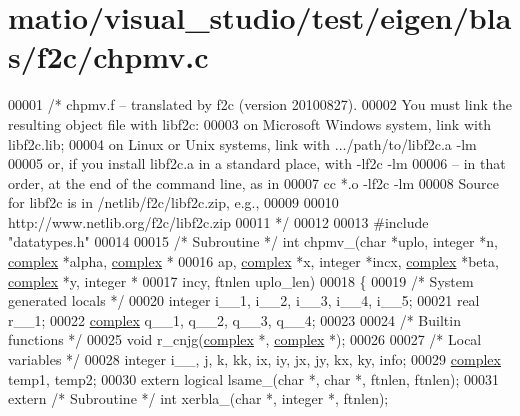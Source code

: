 \hypertarget{matio_2visual__studio_2test_2eigen_2blas_2f2c_2chpmv_8c_source}{}\section{matio/visual\+\_\+studio/test/eigen/blas/f2c/chpmv.c}
\label{matio_2visual__studio_2test_2eigen_2blas_2f2c_2chpmv_8c_source}

\begin{DoxyCode}
00001 \textcolor{comment}{/* chpmv.f -- translated by f2c (version 20100827).}
00002 \textcolor{comment}{   You must link the resulting object file with libf2c:}
00003 \textcolor{comment}{    on Microsoft Windows system, link with libf2c.lib;}
00004 \textcolor{comment}{    on Linux or Unix systems, link with .../path/to/libf2c.a -lm}
00005 \textcolor{comment}{    or, if you install libf2c.a in a standard place, with -lf2c -lm}
00006 \textcolor{comment}{    -- in that order, at the end of the command line, as in}
00007 \textcolor{comment}{        cc *.o -lf2c -lm}
00008 \textcolor{comment}{    Source for libf2c is in /netlib/f2c/libf2c.zip, e.g.,}
00009 \textcolor{comment}{}
00010 \textcolor{comment}{        http://www.netlib.org/f2c/libf2c.zip}
00011 \textcolor{comment}{*/}
00012 
00013 \textcolor{preprocessor}{#include "datatypes.h"}
00014 
00015 \textcolor{comment}{/* Subroutine */} \textcolor{keywordtype}{int} chpmv\_(\textcolor{keywordtype}{char} *uplo, integer *n, \hyperlink{structcomplex}{complex} *alpha, 
      \hyperlink{structcomplex}{complex} *
00016     ap, \hyperlink{structcomplex}{complex} *x, integer *incx, \hyperlink{structcomplex}{complex} *beta, \hyperlink{structcomplex}{complex} *y, integer *
00017     incy, ftnlen uplo\_len)
00018 \{
00019     \textcolor{comment}{/* System generated locals */}
00020     integer i\_\_1, i\_\_2, i\_\_3, i\_\_4, i\_\_5;
00021     real r\_\_1;
00022     \hyperlink{structcomplex}{complex} q\_\_1, q\_\_2, q\_\_3, q\_\_4;
00023 
00024     \textcolor{comment}{/* Builtin functions */}
00025     \textcolor{keywordtype}{void} r\_cnjg(\hyperlink{structcomplex}{complex} *, \hyperlink{structcomplex}{complex} *);
00026 
00027     \textcolor{comment}{/* Local variables */}
00028     integer i\_\_, j, k, kk, ix, iy, jx, jy, kx, ky, info;
00029     \hyperlink{structcomplex}{complex} temp1, temp2;
00030     \textcolor{keyword}{extern} logical lsame\_(\textcolor{keywordtype}{char} *, \textcolor{keywordtype}{char} *, ftnlen, ftnlen);
00031     \textcolor{keyword}{extern} \textcolor{comment}{/* Subroutine */} \textcolor{keywordtype}{int} xerbla\_(\textcolor{keywordtype}{char} *, integer *, ftnlen);

\end{DoxyCode}
